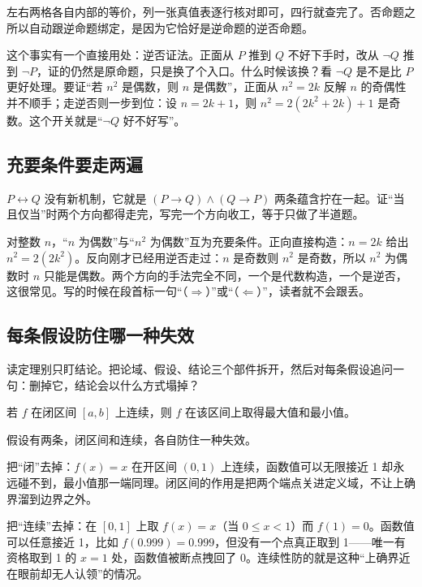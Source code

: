 左右两格各自内部的等价，列一张真值表逐行核对即可，四行就查完了。否命题之所以自动跟逆命题绑定，是因为它恰好是逆命题的逆否命题。

这个事实有一个直接用处：逆否证法。正面从 \(P\) 推到 \(Q\) 不好下手时，改从 \(\neg Q\) 推到 \(\neg P\)，证的仍然是原命题，只是换了个入口。什么时候该换？看 \(\neg Q\) 是不是比 \(P\) 更好处理。要证``若 \(n^2\) 是偶数，则 \(n\) 是偶数''，正面从 \(n^2=2k\) 反解 \(n\) 的奇偶性并不顺手；走逆否则一步到位：设 \(n=2k+1\)，则 \(n^2=2(2k^2+2k)+1\) 是奇数。这个开关就是``\(\neg Q\) 好不好写''。

\subsection{充要条件要走两遍}

\(P\leftrightarrow Q\) 没有新机制，它就是 \((P\to Q)\land(Q\to P)\) 两条蕴含拧在一起。证``当且仅当''时两个方向都得走完，写完一个方向收工，等于只做了半道题。

对整数 \(n\)，``\(n\) 为偶数''与``\(n^2\) 为偶数''互为充要条件。正向直接构造：\(n=2k\) 给出 \(n^2=2(2k^2)\)。反向刚才已经用逆否走过：\(n\) 是奇数则 \(n^2\) 是奇数，所以 \(n^2\) 为偶数时 \(n\) 只能是偶数。两个方向的手法完全不同，一个是代数构造，一个是逆否，这很常见。写的时候在段首标一句``（\(\Rightarrow\)）''或``（\(\Leftarrow\)）''，读者就不会跟丢。

\subsection{每条假设防住哪一种失效}

读定理别只盯结论。把论域、假设、结论三个部件拆开，然后对每条假设追问一句：删掉它，结论会以什么方式塌掉？

\begin{theorem}[最值定理]
若 \(f\) 在闭区间 \([a,b]\) 上连续，则 \(f\) 在该区间上取得最大值和最小值。
\end{theorem}

假设有两条，闭区间和连续，各自防住一种失效。

把``闭''去掉：\(f(x)=x\) 在开区间 \((0,1)\) 上连续，函数值可以无限接近 1 却永远碰不到，最小值那一端同理。闭区间的作用是把两个端点关进定义域，不让上确界溜到边界之外。

把``连续''去掉：在 \([0,1]\) 上取 \(f(x)=x\)（当 \(0\le x<1\)）而 \(f(1)=0\)。函数值可以任意接近 1，比如 \(f(0.999)=0.999\)，但没有一个点真正取到 1——唯一有资格取到 1 的 \(x=1\) 处，函数值被断点拽回了 0。连续性防的就是这种``上确界近在眼前却无人认领''的情况。

